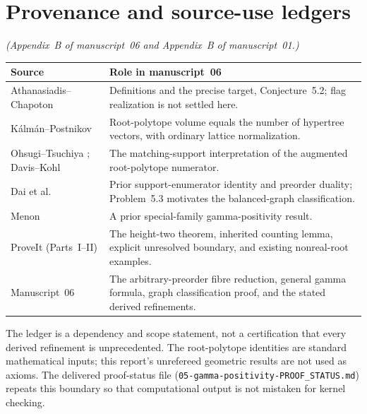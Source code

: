 \documentclass[11pt]{article}
\numberwithin{equation}{section}
\theoremstyle{definition}
\begin{document}
\section{Provenance and source-use ledgers}\label{gam:sec:ledger}
\noindent\emph{(Appendix~B of manuscript~06 and Appendix~B of
manuscript~01.)}
\begin{center}
\small
\begin{tabularx}{\textwidth}{@{}lY@{}}
\toprule
Source & Role in manuscript~06\\
\midrule
Athanasiadis--Chapoton \cite{AC} & Definitions and the precise target,
Conjecture~5.2; flag realization is not settled here.\\
K\'alm\'an--Postnikov \cite{KP} & Root-polytope volume equals the number of
hypertree vectors, with ordinary lattice normalization.\\
Ohsugi--Tsuchiya \cite{OT20}; Davis--Kohl \cite{DK} & The matching-support
interpretation of the augmented root-polytope numerator.\\
Dai et al.\ \cite{DHLTW} & Prior support-enumerator identity and preorder
duality; Problem~5.3 motivates the balanced-graph classification.\\
Menon \cite{Menon} & A prior special-family gamma-positivity result.\\
ProveIt (Parts~I--II) & The height-two theorem, inherited counting lemma,
explicit unresolved boundary, and existing nonreal-root examples.\\
Manuscript~06 & The arbitrary-preorder fibre reduction, general gamma
formula, graph classification proof, and the stated derived refinements.\\
\bottomrule
\end{tabularx}
\end{center}
The ledger is a dependency and scope statement, not a certification that
every derived refinement is unprecedented. The root-polytope identities are
standard mathematical inputs; this report's unrefereed geometric results
are not used as axioms. The delivered proof-status file
(\texttt{05-gamma-positivity-PROOF\_STATUS.md}) repeats this boundary so
that computational output is not mistaken for kernel checking.
\end{document}
